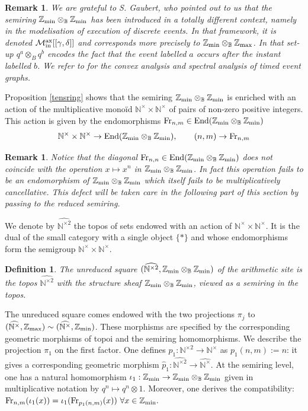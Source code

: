 \documentclass[noams,lp]{compositio}
\newtheorem{defn}[thm]{Definition} %
\newtheorem{rem}[thm]{Remark}
\def\End{{\rm End}}
\def\B{{\mathbb B}}
\def\N{{\mathbb N}}
\def\Z{{\mathbb Z}}
\def\cM{{\mathcal M}}
\def\zmin{\Z_{\rm min}}
\def\End{{\mbox{End}}}
\def\zmax{{\Z_{\rm max}}}
\def\fr{{\rm Fr}}
\def\arith{{(\wnt,\bar \N)}}
\def\nt{\N^{\times}}
\def\wnt{{\widehat{\N^{\times}}}}
\def\nbo{{\zmin\otimes_\B \zmin}}
\def\arith{{(\wnt,\zmax)}}
\def\wntb{{\widehat{\N^{\times 2}}}}
\def\arithb{{(\wntb,\nbo)}}
\begin{document}
\begin{rem}\label{Steph}{\rm We are grateful to S. Gaubert, who pointed out to us that 
 the semiring $\zmin\otimes_\B\zmin$
has been introduced in a totally different context, namely in the modelisation 
of execution of discrete events.
In that framework, it is denoted  $\cM_{\rm in}^{\rm ax}[[\gamma,\delta]]$ and corresponds more precisely to $\zmin\otimes_\B\zmax$.
In that set-up  $q^a \otimes_B q^b$ encodes the fact that the event labelled  $a$ 
occurs  after the instant labelled $b$. We refer to \cite{Gaubert1} for the convex analysis and spectral analysis of timed event graphs.
}\end{rem}

Proposition \ref{tensring} shows that the semiring $\nbo$ is enriched with an action of the multiplicative mono\"id $\nt\times \nt$  of pairs of non-zero positive integers. This action is given by the endomorphisms $\fr_{n,m}\in \End(\nbo)$
\begin{equation}\label{Fr}
\nt\times \nt \to \End(\nbo),\qquad (n,m)\to \fr_{n,m}
\end{equation}
\begin{rem}{\rm Notice that the diagonal $\fr_{n,n}\in \End(\nbo)$ does not coincide with the operation 
$x\mapsto x^n$ in $\nbo$. In fact this operation fails to be an endomorphism of $\nbo$ which itself fails to be multiplicatively cancellative. This defect will be taken care in the following part of this section by passing to the reduced semiring.
}\end{rem}

We denote by $\wntb$ the topos of sets endowed with an action of  $\nt\times \nt$. It is the dual of the small category with a single object $\{*\}$ and whose endomorphisms form the semigroup $\nt\times \nt$.


\begin{defn}\label{site2} The {\em unreduced square} $\arithb$ of the arithmetic site is the topos $\wntb$ with the  {\em structure sheaf} $\nbo$, viewed as a semiring in the topos.
\end{defn}

The unreduced square comes endowed with the two projections $\pi_j$ to $\arith\sim (\wnt,\zmin)$. These morphisms are specified by the corresponding geometric morphisms of topoi and the semiring homomorphisms. We describe the projection $\pi_1$ on the first factor. One defines $p_1:\N^{\times 2}\to \N^\times$ as $p_1(n,m):=n$: it gives a corresponding geometric morphism $\hat p_1: \wntb\to \wnt$. At the semiring level, one has a natural homomorphism $\iota_1:\zmin\to \nbo$ given in multiplicative notation by $q^n\mapsto q^n\otimes 1$. Moreover, one derives the compatibility:
$
\fr_{n,m}(\iota_1(x))=\iota_1(\fr_{p_1(n,m)}(x))\ \forall x\in \zmin.
$
\end{document}
